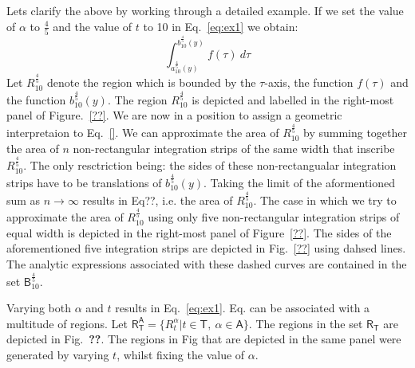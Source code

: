 \documentclass{article}
\theoremstyle{theorem}
\theoremstyle{definition}
\begin{document}
Lets clarify the above by working through a detailed example. If we set the value of $\alpha$ to $\frac{4}{5}$ and the value of $t$ to 10 in Eq.~\eqref{eq:ex1} we obtain:
\begin{equation}
\int_{a_{10}^{\frac{4}{5}}(y)}^{b_{10}^{\frac{4}{5}}(y)} f(\tau)~d\tau 
\end{equation}
Let $R_{10}^{\frac{4}{5}}$ denote the region which is bounded by the $\tau$-axis, the function $f(\tau)$ and the function $b_{10}^{\frac{4}{5}}(y)$. The region $R_{10}^{\frac{4}{5}}$ is depicted and labelled in the right-most panel of Figure.~\ref{??}. We are now in a position to assign a geometric 
interpretaion to Eq.~\eqref{}. We can approximate the area of $R_{10}^{\frac{4}{5}}$ by summing together the area of $n$ non-rectangular integration strips of the same width that inscribe $R_{10}^{\frac{4}{5}}$. The only resctriction being: the sides of these non-rectangualar integration strips have to be translations of $b_{10}^{\frac{4}{5}}(y)$.
Taking the limit of the aformentioned sum as $n\rightarrow \infty$ results in 
Eq??, i.e. the area of $R_{10}^{\frac{4}{5}}$. The case in which we try to approximate the area of $R_{10}^{\frac{4}{5}}$ using only five non-rectangular integration strips of equal width is depicted in the right-most panel of Figure~\ref{??}. The sides of the 
aforementioned five integration strips are depicted in Fig.~\ref{??} using dahsed lines. The analytic expressions associated with these dashed curves are contained in the set $\mathsf{B}_{10}^{\frac{4}{5}}$. 

Varying both $\alpha$ and $t$ results in Eq.~\ref{eq:ex1}. Eq. can be associated with a multitude of regions. Let $\mathsf{R}_{\mathsf{T}}^{\mathsf{A}}=\{R_t^{\alpha}|t\in\mathsf{T},~\alpha\in\mathsf{A}\}$. The regions in the set $\mathsf{R}_{\mathsf{T}}$ 
are depicted in Fig.~\textbf{??}. The regions in Fig that are depicted in the same panel were generated by varying $t$, whilst fixing the value of $\alpha$.  
\end{document}
